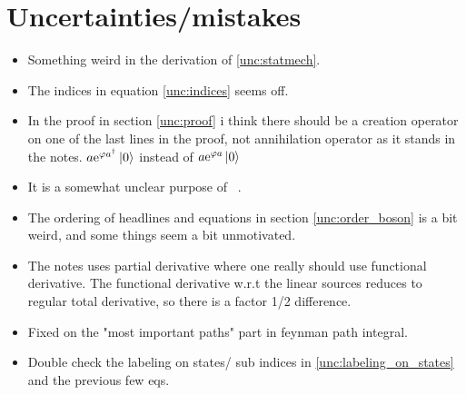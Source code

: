 \section{Uncertainties/mistakes}

\begin{itemize}
\item Something weird in the derivation of \eqref{unc:statmech}.
\item The indices in equation \eqref{unc:indices} seems off.  
\item In the proof in section \ref{unc:proof} i think there should be a creation operator on one of the last lines in the proof, not annihilation operator as it stands in the notes. $a\mathrm{e}^{\varphi a^\dagger}\ket{0}$ instead of $a\mathrm{e}^{\varphi a}\ket{0}$
\item It is a somewhat unclear purpose of ~. 
\item The ordering of headlines and equations in section \ref{unc:order_boson} is a bit weird, and some things seem a bit unmotivated. 
\item The notes uses partial derivative where one really should use functional derivative. The functional derivative w.r.t the linear sources reduces to regular total derivative, so there is a factor 1/2 difference. 
\item Fixed on the "most important paths" part in feynman path integral. 
\item Double check the labeling on states/ sub indices in \eqref{unc:labeling_on_states} and the previous few eqs. 

\end{itemize}